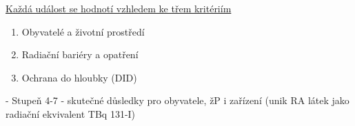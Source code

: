 \begin{comment}
    \item 3 = Vážná nehoda, významné poškození ovšem bez nutností vnějšího zásahu (další porucha bezpečnostních systémů by mohla vést k havarijním podmínkám)

    \item 4 = Havárie bez vážnějšího rizika vně zařízení, havárie bez významného vlivu na okolí, významné poškození zařízení (např. částečné tavení AZ). Ozáření obyvatelstvo na úrovni ročních limitů pro obyvatelstvo, ozáření pracovníků na úrovni možných časných úmrtí.

    \item 5 = Havárie s rizikem vně zařízení, těžké poškození jaderného zařízení (havárie s kritičností, velký požár, exploze), únik významného množství radioaktivity, aplikace opatření pro snížení rizika poškození zdraví u obyvatelstva

    \item 6 = Těžká havárie, velký únik radioaktivity do ŽP, plná aktivace opatření pro snížení pravděpodobnosti zdravotních následků u obyvatelstva

    \item 7 = Velmi těžká havárie, únik velmi velkého množství radioaktivity, možnost akutních zdravotních účinků, dlouhodobé poškození ŽP, vliv přesahuje hranice státu.
\end{itemize}

\subsubsection{Kritéria hodnocení dle INES}
- Každá událost se hodnotí vzhledem ke třem kritériím, přičemž výsledné hodnocení je dáno nejvyšším stupněm dle všech tří kritérií.

\begin{itemize}
    \item Obyvatelé a ŽP (stupně 2-7 podle dopadu, resp. dávek na obyvatelstov a pracovníky a podle množství uvolněné aktivity, resp. RA látek)
    \item Radiační bariéry a opatření (stupně 2 - 5)
    \item Ochrana do hloubky (DID) - (stupně 1 - 3)
\end{itemize}

- Pro zahrnutí širokého spektra radioaktivních izotopů, které se mohou uvolnit do ŽP se používá koncept radiačního ekvivalentu - \iso{131}{I}
\end{comment}
\underline{Každá událost se hodnotí vzhledem ke třem kritériím}
\begin{enumerate}
	\item 	Obyvatelé a životní prostředí
	\item 	Radiační bariéry a opatření
	\item 	Ochrana do hloubky (DID)
\end{enumerate}
\noindent - 	Stupeň 4-7 - skutečné důsledky pro obyvatele, žP i zařízení (unik RA látek jako radiační ekvivalent TBq 131-I)

